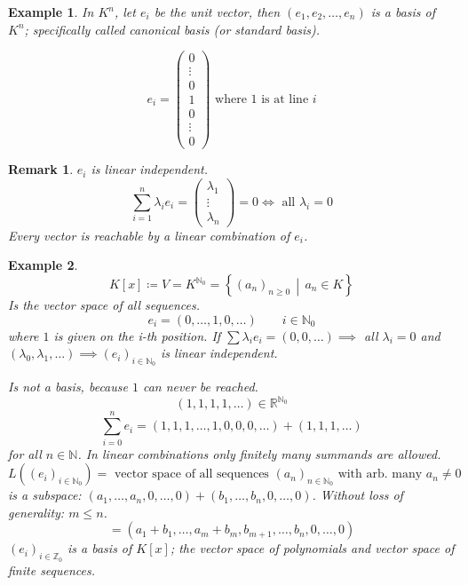 \documentclass[a4paper,landscape,twocolumn]{article}
\newcommand\setdef[2]{\left\{#1\,\middle|\,#2\right\}}
\newtheorem{ex}{Example}[section]
\newtheorem{rem}{Remark}[section]
\begin{document}
\begin{ex}
  In $K^n$, let $e_i$ be the unit vector,
  then $(e_1, e_2, \ldots, e_n)$ is a basis of $K^n$; specifically called \emph{canonical basis} (or \emph{standard basis}).

  \[ e_i = \begin{pmatrix} 0 \\ \vdots \\ 0 \\ 1 \\ 0 \\ \vdots \\ 0 \end{pmatrix} \text{ where 1 is at line $i$} \]
\end{ex}

\begin{rem}
  $e_i$ is linear independent.
  \[
      \sum_{i=1}^n \lambda_i e_i
      = \begin{pmatrix} \lambda_1 \\ \vdots \\ \lambda_n \end{pmatrix}
      = 0 \iff \text{ all } \lambda_i = 0
  \]
  Every vector is reachable by a linear combination of $e_i$.
\end{rem}

\begin{ex}
  \[ K[x] \coloneqq V = K^{\mathbb N_0} = \setdef{(a_n)_{n \geq 0}}{a_n \in K} \]
  Is the vector space of all sequences.
  \[ e_i = (0, \ldots, 1, 0, \ldots) \qquad i \in \mathbb N_0 \]
  where $1$ is given on the i-th position.
  If $\sum \lambda_i e_i = (0, 0, \ldots) \implies$  all $\lambda_i = 0$
  and $(\lambda_0, \lambda_1, \ldots) \implies (e_i)_{i \in \mathbb N_0}$ is linear independent.

  Is not a basis, because $1$ can never be reached.
  \[ (1, 1, 1, 1, \ldots) \in \mathbb R^{\mathbb N_0} \]
  \[ \sum_{i=0}^n e_i = (1, 1, 1, \ldots, 1, 0, 0, 0, \ldots) + (1, 1, 1, \ldots) \]
  for all $n \in \mathbb N$. In linear combinations only finitely many summands are allowed.
  \[ L\left((e_i)_{i \in \mathbb N_0}\right) = \text{ vector space of all sequences } (a_n)_{n \in \mathbb N_0} \text{ with arb. many } a_n \neq 0 \]
  is a subspace: $(a_1, \ldots, a_n, 0, \ldots, 0) + (b_1, \ldots, b_n, 0, \ldots, 0)$.
  Without loss of generality: $m \leq n$.
  \[ = (a_1 + b_1, \ldots, a_m + b_m, b_{m+1}, \ldots, b_n, 0, \ldots, 0) \]
  $(e_i)_{i \in \mathbb Z_0}$ is a basis of $K[x]$; the vector space of polynomials and vector space of finite sequences.
\end{ex}
\end{document}
